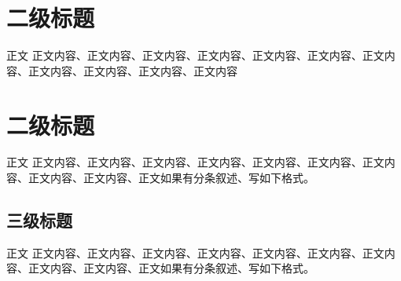 \section{二级标题}

正文 正文内容、正文内容、正文内容、正文内容、正文内容、正文内容、正文内容、正文内容、正文内容、正文内容、正文内容
\section{二级标题}

正文 正文内容、正文内容、正文内容、正文内容、正文内容、正文内容、正文内容、正文内容、正文内容、正文如果有分条叙述、写如下格式。

\subsection{三级标题}

正文 正文内容、正文内容、正文内容、正文内容、正文内容、正文内容、正文内容、正文内容、正文内容、正文如果有分条叙述、写如下格式。
